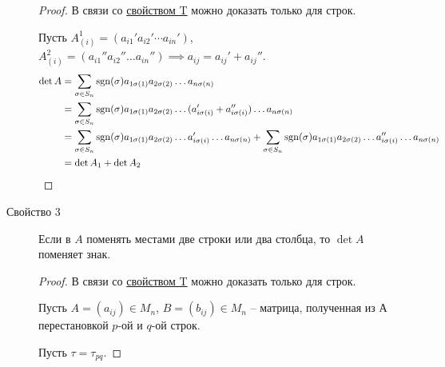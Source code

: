 \begin{description}
    \begin{proof}
        В связи со \hyperref[det:prop_t]{свойством T} можно доказать только для строк.

        Пусть $A_{(i)}^1 = (a_{i1}' a_{i2}' \cdots a_{in}')$, $A_{(i)}^2 = (a_{i1}'' a_{i2}'' \dots a_{in}'') \implies a_{ij} = a_{ij}' + a_{ij}''$.
        \begin{align*}
            \det A
            &= \sum_{\sigma \in S_n} \operatorname{\mathop{\mathrm{sgn}}}(\sigma) a_{1\sigma(1)} a_{2\sigma(2)} \dots a_{n\sigma(n)} \\
            &= \sum_{\sigma \in S_n} \operatorname{\mathop{\mathrm{sgn}}}(\sigma) a_{1\sigma(1)} a_{2\sigma(2)} \dots (a'_{i\sigma(i)} + a''_{i\sigma(i)}) \dots a_{n \sigma(n)} \\
            &= \sum_{\sigma \in S_n} \operatorname{\mathop{\mathrm{sgn}}}(\sigma) a_{1\sigma(1)} a_{2\sigma(2)} \dots a'_{i\sigma(i)} \dots a_{n\sigma(n)} + \sum_{\sigma \in S_n} \operatorname{\mathop{\mathrm{sgn}}}(\sigma) a_{1\sigma(1)} a_{2\sigma(2)} \dots a''_{i\sigma(i)} \dots a_{n\sigma(n)} \\
            &= \det A_1 + \det A_2
        \end{align*}
    \end{proof}

\item[Свойство 3\label{det:prop_3}]
    Если в $A$ поменять местами две строки или два столбца, то $\det A$ поменяет знак.

    \begin{proof}
        В связи со \hyperref[det:prop_t]{свойством T} можно доказать только для строк.

        Пусть $A = (a_{ij}) \in M_n$, $B = (b_{ij}) \in M_n $ -- матрица, полученная из А перестановкой $p$-ой и $q$-ой строк.

        Пусть $\tau = \tau_{pq}$.


\end{proof}
\end{description}
